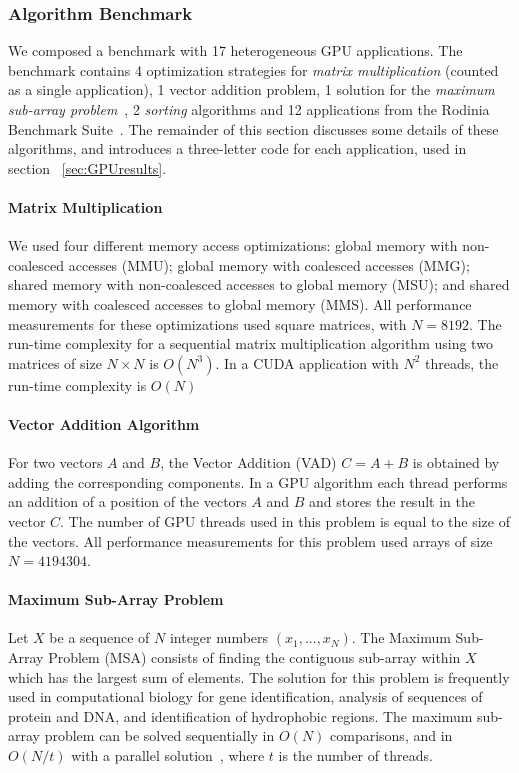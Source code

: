 \subsubsection{Algorithm Benchmark}

We composed a benchmark with 17 heterogeneous GPU applications.  The benchmark
contains 4 optimization strategies for \emph{matrix multiplication} (counted as
a single application), 1 vector addition problem, 1 solution for the
\emph{maximum sub-array problem}~\cite{ferreira2014parallel}, 2 \emph{sorting}
algorithms and 12 applications from the Rodinia Benchmark
Suite~\cite{che2009rodinia}.  The remainder of this section discusses some
details of these algorithms, and introduces a three-letter code for each
application, used in section ~\ref{sec:GPUresults}.

\paragraph{Matrix Multiplication} We used four different memory access
optimizations: global memory with non-coalesced accesses (MMU); global memory
with coalesced accesses (MMG); shared memory with non-coalesced accesses to
global memory (MSU); and shared memory with coalesced accesses to global memory
(MMS).  All performance measurements for these optimizations used square
matrices, with $N = 8192$.  The run-time complexity for a sequential matrix
multiplication algorithm using two matrices of size $N\times{}N$ is $O(N^3)$.
In a CUDA application with $N^2$ threads, the run-time complexity is $O(N)$

\paragraph{Vector Addition Algorithm} For two vectors $A$ and $B$, the Vector
Addition (VAD) $C = A + B$ is obtained by adding the corresponding components.
In a GPU algorithm each thread performs an addition of a position of the
vectors $A$ and $B$ and stores the result in the vector $C$.  The number of GPU
threads used in this problem is equal to the size of the vectors.  All
performance measurements for this problem used arrays of size $N = 4194304$.

\paragraph{Maximum Sub-Array Problem} Let $X$ be a sequence of $N$ integer
numbers $(x_1, ... , x_N)$.  The Maximum Sub-Array Problem (MSA) consists of
finding the contiguous sub-array within $X$ which has the largest sum of
elements. The solution for this problem is frequently used in computational
biology for gene identification, analysis of sequences of protein and DNA, and
identification of hydrophobic regions.  The maximum sub-array problem can be
solved sequentially in $O(N)$ comparisons, and in $O(N/t)$
with a parallel solution~\cite{alves2004bsp}, where $t$ is the number of
threads.

